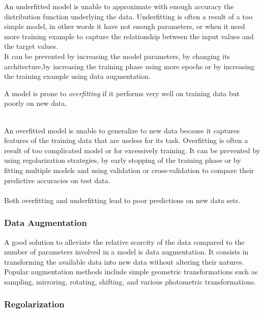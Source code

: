 An underfitted model is unable to approximate with enough accuracy the distribution function underlying the data.
Underfitting is often a result of a too simple model, in other words it have not enough parameters, or when it need more training example to capture the relationship between the input values and the target values.\\
It can be prevented by increasing the model parameters, by changing its architecture,by increasing the training phase using more epochs or by increasing the training example using data augmentation.

\begin{defn}
	A model is prone to \emph{overfitting} if it performs very well on training data but poorly on new data.
\end{defn}
{}\\
An overfitted model is unable to generalize to new data because it captures features of the training data that are useless for its task. 
 Overfitting is often a result of too complicated model or for excessively training.
 It can be prevented by using regolarization strategies, by early stopping of the training phase or by fitting multiple models and using validation or cross-validation to compare their predictive accuracies on test data.\\
 {}\\
 Both overfitting and underfitting lead to poor predictions on new data sets.
 
 \subsubsection{Data Augmentation}
 A good solution to alleviate the relative scarcity of the data compared to the number of parameters involved in a model is data augmentation.
It consists in transforming the available data into new data without altering their natures. Popular augmentation methods include simple geometric transformations such as sampling, mirroring, rotating, shifting, and various photometric transformations.
 
 
 \subsubsection{Regolarization}
 
